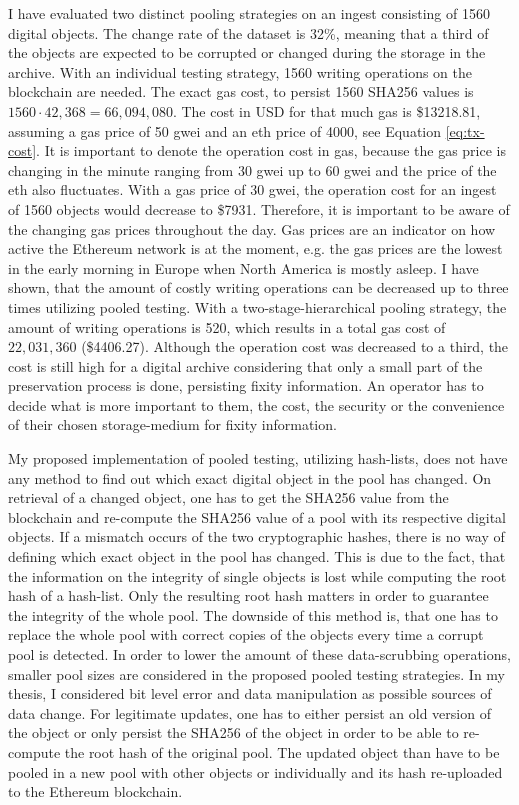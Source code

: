 I have evaluated two distinct pooling strategies on an ingest consisting of 1560 digital objects. The change rate of the dataset is 32\%, meaning that a third of the objects are expected to be corrupted or changed during the storage in the archive. With an individual testing strategy, 1560 writing operations on the blockchain are needed. The exact gas cost, to persist 1560 SHA256 values is $1560 \cdot 42,368 = 66,094,080$. The cost in USD for that much gas is \$13218.81, assuming a gas price of 50 \acrlong{gwei} and an \acrlong{eth} price of 4000, see Equation \ref{eq:tx-cost}. It is important to denote the operation cost in gas, because the gas price is changing in the minute ranging from 30 \acrlong{gwei} up to 60 \acrlong{gwei} and the price of the \acrlong{eth} also fluctuates. With a gas price of 30 \acrlong{gwei}, the operation cost for an ingest of 1560 objects would decrease to \$7931.
Therefore, it is important to be aware of the changing gas prices throughout the day. Gas prices are an indicator on how active the Ethereum network is at the moment, e.g. the gas prices are the lowest in the early morning in Europe when North America is mostly asleep.
I have shown, that the amount of costly writing operations can be decreased up to three times utilizing pooled testing. With a two-stage-hierarchical pooling strategy, the amount of writing operations is 520, which results in a total gas cost of $22,031,360$ (\$4406.27).
Although the operation cost was decreased to a third, the cost is still high for a digital archive considering that only a small part of the preservation process is done, persisting fixity information. An operator has to decide what is more important to them, the cost, the security or the convenience of their chosen storage-medium for fixity information. 

My proposed implementation of pooled testing, utilizing hash-lists, does not have any method to find out which exact digital object in the pool has changed. On retrieval of a changed object, one has to get the SHA256 value from the blockchain and re-compute the SHA256 value of a pool with its respective digital objects. If a mismatch occurs of the two cryptographic hashes, there is no way of defining which exact object in the pool has changed. This is due to the fact, that the information on the integrity of single objects is lost while computing the root hash of a hash-list. Only the resulting root hash matters in order to guarantee the integrity of the whole pool. The downside of this method is, that one has to replace the whole pool with correct copies of the objects every time a corrupt pool is detected. In order to lower the amount of these data-scrubbing operations, smaller pool sizes are considered in the proposed pooled testing strategies.
In my thesis, I considered bit level error and data manipulation as possible sources of data change. For legitimate updates, one has to either persist an old version of the object or only persist the SHA256 of the object in order to be able to re-compute the root hash of the original pool. The updated object than have to be pooled in a new pool with other objects or individually and its hash re-uploaded to the Ethereum blockchain.

